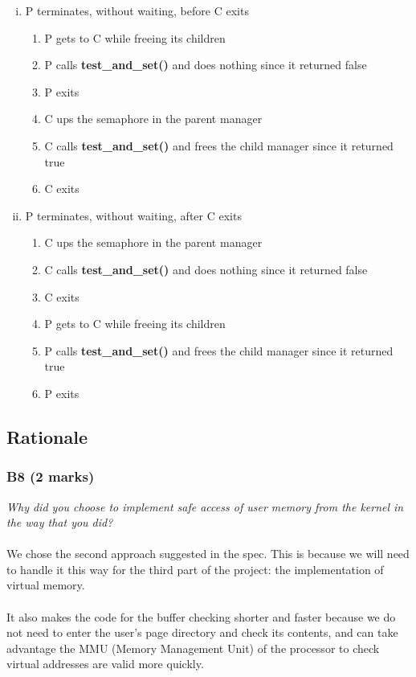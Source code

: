 \documentclass{report}
\newcommand{\question}[1]{\textit{#1} \ }
\newcommand{\fun}[1]{\textcolor{Emerald}{\textbf{#1}}}
\begin{document}
\begin{enumerate}[(i)]
                    \item P terminates, without waiting, before C exits
                    \begin{enumerate}
                      \item P gets to C while freeing its children
                      \item P calls \fun{test\_and\_set()} and does nothing since it returned false
                      \item P exits 
                      \item C ups the semaphore in the parent manager
                      \item C calls \fun{test\_and\_set()} and frees the child manager since it returned true
                      \item C exits
                    \end{enumerate}
                    \item P terminates, without waiting, after C exits
                    \begin{enumerate}
                      \item C ups the semaphore in the parent manager
                      \item C calls \fun{test\_and\_set()} and does nothing since it returned false
                      \item C exits
                      \item P gets to C while freeing its children
                      \item P calls \fun{test\_and\_set()} and frees the child manager since it returned true
                      \item P exits
                    \end{enumerate}
                  \end{enumerate}
        
        \subsection*{Rationale}
            \subsubsection*{B8 (2 marks)}
                \question{Why did you choose to implement safe access of user memory from the kernel in the way that you did?}
                  \\
				    			\\ We chose the second approach suggested in the spec. This is because we will need to handle it this way for the third part of the
                                project: the implementation of virtual memory. 
                                \\
                                \\It also makes the code for the buffer checking shorter and faster because we do not need to enter the user's page directory 
                                and check its contents, and can take advantage the MMU (Memory Management Unit) of the processor to check virtual addresses are valid more quickly.
\end{document}
